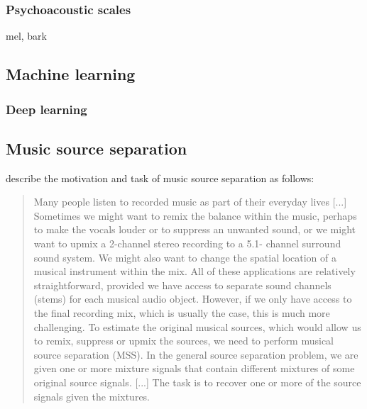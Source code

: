 \documentclass[report.tex]{subfiles}
\begin{document}
\subsubsection{Psychoacoustic scales}

mel, bark

\vfill
\clearpage

\subsection{Machine learning}
\label{sec:ml}


\subsubsection{Deep learning}
\label{sec:dl}

\vfill
\clearpage

\subsection{Music source separation}
\label{sec:musicsep}

\textcite{musicsepgood} describe the motivation and task of music source separation as follows:

\begin{quote}
	Many people listen to recorded music as part of their everyday lives [...] Sometimes we might want to remix the balance within the music, perhaps to make the vocals louder or to suppress an unwanted sound, or we might want to upmix a 2-channel stereo recording to a 5.1- channel surround sound system. We might also want to change the spatial location of a musical instrument within the mix. All of these applications are relatively straightforward, provided we have access to separate sound channels (stems) for each musical audio object. However, if we only have access to the final recording mix, which is usually the case, this is much more challenging. To estimate the original musical sources, which would allow us to remix, suppress or upmix the sources, we need to perform musical source separation (MSS). In the general source separation problem, we are given one or more mixture signals that contain different mixtures of some original source signals. [...] The task is to recover one or more of the source signals given the mixtures.
\end{quote}
\end{document}
